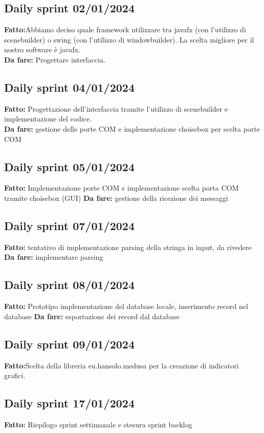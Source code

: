 \documentclass{report}
\begin{document}
\subsection{Daily sprint 02/01/2024}
\textbf{Fatto:}Abbiamo deciso quale framework utilizzare tra javafx (con l'utilizzo di scenebuilder) o swing (con l'utilizzo di windowbuilder). La scelta migliore per il nostro software è javafx.\\
\textbf{Da fare:} Progettare interfaccia.

\subsection{Daily sprint 04/01/2024}
\textbf{Fatto:} Progettazione dell'interfaccia tramite l'utilizzo di scenebuilder e implementazione del codice.\\
\textbf{Da fare:} gestione delle porte COM e implementazione choisebox per scelta porte COM
\subsection{Daily sprint 05/01/2024}
\textbf{Fatto:} Implementazione porte COM e implementazione scelta porta COM tramite choisebox (GUI)
\textbf{Da fare:} gestione della ricezione dei messaggi

\subsection{Daily sprint 07/01/2024}
\textbf{Fatto:} tentativo di implementazione parsing della stringa in input, da rivedere
\textbf{Da fare:} implementare parsing
\subsection{Daily sprint 08/01/2024}
\textbf{Fatto:} Prototipo implementazione del database locale, inserimento record nel database
\textbf{Da fare:} esportazione dei record dal database
\subsection{Daily sprint 09/01/2024}
\textbf{Fatto:}Scelta della libreria eu.hansolo.medusa per la creazione di indicatori grafici.\\

\subsection{Daily sprint 17/01/2024}
\textbf{Fatto:} Riepilogo sprint settimanale e stesura sprint backlog\\\\
\end{document}
